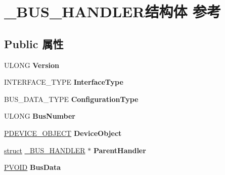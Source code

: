\hypertarget{struct___b_u_s___h_a_n_d_l_e_r}{}\section{\+\_\+\+B\+U\+S\+\_\+\+H\+A\+N\+D\+L\+E\+R结构体 参考}
\label{struct___b_u_s___h_a_n_d_l_e_r}
\subsection*{Public 属性}
\begin{DoxyCompactItemize}
\item 
\mbox{\label{struct___b_u_s___h_a_n_d_l_e_r_a1276b68b72bfe71bb7facd02cf9e976c}} 
U\+L\+O\+NG {\bfseries Version}
\item 
\mbox{\label{struct___b_u_s___h_a_n_d_l_e_r_ae8dcaa10860f8c435285fad1683a6587}} 
I\+N\+T\+E\+R\+F\+A\+C\+E\+\_\+\+T\+Y\+PE {\bfseries Interface\+Type}
\item 
\mbox{\label{struct___b_u_s___h_a_n_d_l_e_r_a5f394b415db3278662c639162fa47436}} 
B\+U\+S\+\_\+\+D\+A\+T\+A\+\_\+\+T\+Y\+PE {\bfseries Configuration\+Type}
\item 
\mbox{\label{struct___b_u_s___h_a_n_d_l_e_r_a0ce69502b3f9a52626d0e378c4896650}} 
U\+L\+O\+NG {\bfseries Bus\+Number}
\item 
\mbox{\label{struct___b_u_s___h_a_n_d_l_e_r_ad0d95da1f9310d91c994277bec2b9a4e}} 
\hyperlink{struct___d_e_v_i_c_e___o_b_j_e_c_t}{P\+D\+E\+V\+I\+C\+E\+\_\+\+O\+B\+J\+E\+CT} {\bfseries Device\+Object}
\item 
\mbox{\label{struct___b_u_s___h_a_n_d_l_e_r_a8e5f37d55ae5e7e01a1d8e9a7e5f10f4}} 
\hyperlink{interfacestruct}{struct} \hyperlink{struct___b_u_s___h_a_n_d_l_e_r}{\+\_\+\+B\+U\+S\+\_\+\+H\+A\+N\+D\+L\+ER} $\ast$ {\bfseries Parent\+Handler}
\item 
\mbox{\label{struct___b_u_s___h_a_n_d_l_e_r_af65a5cd1fc58d4a8c34bd951fec03647}} 
\hyperlink{interfacevoid}{P\+V\+O\+ID} {\bfseries Bus\+Data}

\end{DoxyCompactItemize}
